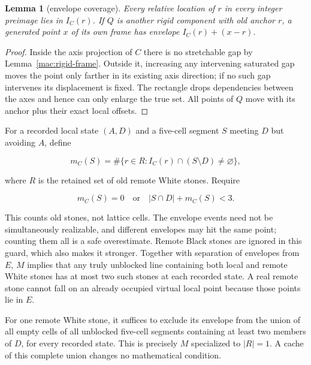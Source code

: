 \documentclass[11pt]{article}
\newtheorem{lemma}[theorem]{Lemma}
\theoremstyle{definition}
\theoremstyle{remark}
\begin{document}
\begin{lemma}[envelope coverage]\label{mac:envelope}
Every relative location of \(r\) in every integer preimage lies in \(I_C(r)\). If \(Q\) is another rigid component with old anchor \(r\), a generated point \(x\) of its own frame has envelope \(I_C(r)+(x-r)\).

\end{lemma}
\begin{proof}
Inside the axis projection of \(C\) there is no stretchable gap by Lemma~\ref{mac:rigid-frame}. Outside it, increasing any intervening saturated gap moves the point only farther in its existing axis direction; if no such gap intervenes its displacement is fixed. The rectangle drops dependencies between the axes and hence can only enlarge the true set. All points of \(Q\) move with its anchor plus their exact local offsets. 
\end{proof}

For a recorded local state \((A,D)\) and a five-cell segment \(S\) meeting \(D\) but avoiding \(A\), define

\[
 m_C(S)=\#\{r\in R:I_C(r)\cap(S\setminus D)\ne\varnothing\},
\]

where \(R\) is the retained set of old remote White stones. Require

\[
 m_C(S)=0\quad\text{or}\quad |S\cap D|+m_C(S)<3.\tag{M}
\]

This counts old stones, not lattice cells. The envelope events need not be simultaneously realizable, and different envelopes may hit the same point; counting them all is a safe overestimate. Remote Black stones are ignored in this guard, which also makes it stronger. Together with separation of envelopes from \(E\), \(M\) implies that any truly unblocked line containing both local and remote White stones has at most two such stones at each recorded state. A real remote stone cannot fall on an already occupied virtual local point because those points lie in \(E\).

For one remote White stone, it suffices to exclude its envelope from the union of all empty cells of all unblocked five-cell segments containing at least two members of \(D\), for every recorded state. This is precisely \(M\) specialized to \(|R|=1\). A cache of this complete union changes no mathematical condition.
\end{document}
